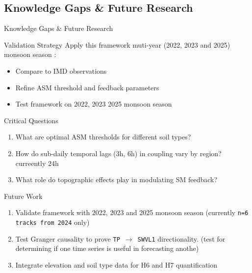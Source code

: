 \documentclass[8pt, aspectratio=169]{beamer}
\begin{document}
\subsection{Knowledge Gaps \& Future Research}
\begin{frame}{Knowledge Gaps \& Future Research}
    \vspace{-0.1cm}
    \begin{block}{Validation Strategy}
        \footnotesize
        Apply this framework muti-year (2022, 2023 and 2025) monsoon season :
        \begin{itemize}
            \item Compare to IMD observations
            \item Refine ASM threshold and feedback parameters
            \item Test framework on 2022, 2023 2025 monsoon season
        \end{itemize}
    \end{block}

    \begin{block}{Critical Questions}
        \footnotesize
        \begin{enumerate}
            \item What are optimal ASM thresholds for different soil types?
            \item How do sub-daily temporal lags (3h, 6h) in coupling vary by region? curreently 24h
            \item What role do topographic effects play in modulating SM feedback?
        \end{enumerate}
    \end{block}

    \begin{block}{\small Future Work}
        \footnotesize
        \begin{enumerate}
        \item Validate framework with 2022, 2023 and 2025 monsoon season (currently \texttt{n=6 tracks from 2024} only)
            \item Test Granger causality to prove \texttt{TP $\rightarrow$ SWVL1} directionality. (\tiny test for determining if one time series is useful in forecasting anothe)\footnotesize
            \item Integrate elevation and soil type data for H6 and H7 quantification
        \end{enumerate}
    \end{block}


\end{frame}
\end{document}
